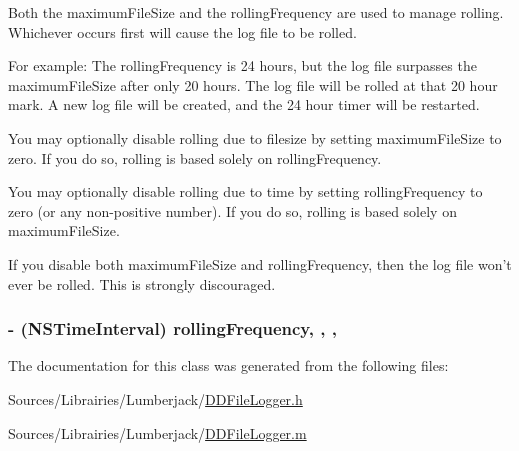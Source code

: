 Both the maximum\-File\-Size and the rolling\-Frequency are used to manage rolling. Whichever occurs first will cause the log file to be rolled.

For example\-: The rolling\-Frequency is 24 hours, but the log file surpasses the maximum\-File\-Size after only 20 hours. The log file will be rolled at that 20 hour mark. A new log file will be created, and the 24 hour timer will be restarted.

You may optionally disable rolling due to filesize by setting maximum\-File\-Size to zero. If you do so, rolling is based solely on rolling\-Frequency.

You may optionally disable rolling due to time by setting rolling\-Frequency to zero (or any non-\/positive number). If you do so, rolling is based solely on maximum\-File\-Size.

If you disable both maximum\-File\-Size and rolling\-Frequency, then the log file won't ever be rolled. This is strongly discouraged. \hypertarget{interface_d_d_file_logger_a67cba816078da08aad69f0728b6ea3f9}{
\subsubsection[{rolling\-Frequency}]{\setlength{\rightskip}{0pt plus 5cm}-\/ (N\-S\-Time\-Interval) rolling\-Frequency\hspace{0.3cm}{\ttfamily [read]}, {\ttfamily [write]}, {\ttfamily [atomic]}, {\ttfamily [assign]}}}\label{interface_d_d_file_logger_a67cba816078da08aad69f0728b6ea3f9}


The documentation for this class was generated from the following files\-:\begin{DoxyCompactItemize}
\item 
Sources/\-Librairies/\-Lumberjack/\hyperlink{_d_d_file_logger_8h}{D\-D\-File\-Logger.\-h}\item 
Sources/\-Librairies/\-Lumberjack/\hyperlink{_d_d_file_logger_8m}{D\-D\-File\-Logger.\-m}\end{DoxyCompactItemize}
